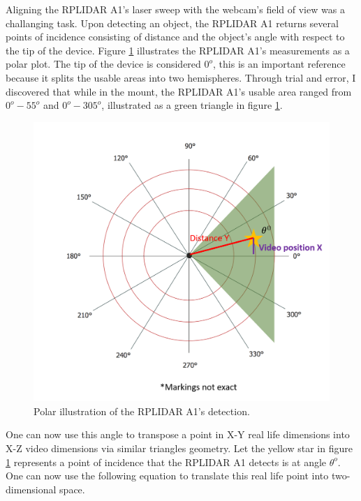 \documentclass[onecolumn, draftclsnofoot,10pt, compsoc]{IEEEtran}
\makeatletter
\newcommand\captionof[1]{\def\@captype{#1}\caption}
\makeatother
\begin{document}
\begin{singlespace}
		Aligning the RPLIDAR A1's laser sweep with the webcam's field of view was a challanging task.
		Upon detecting an object, the RPLIDAR A1 returns several points of incidence consisting of distance and the object's angle with respect to the tip of the device.
		Figure \ref{polar} illustrates the RPLIDAR A1's measurements as a polar plot.
		The tip of the device is considered \( 0^o \), this is an important reference because it splits the usable areas into two hemispheres.
		Through trial and error, I discovered that while in the mount, the RPLIDAR A1's usable area ranged from \( 0^o - 55^o\) and \( 0^o - 305^o\), illustrated as a green triangle in figure \ref{polar}.

		\begin{figure}[H]
		\includegraphics[scale=0.4]{polar.png}
		\captionof{figure}{Polar illustration of the RPLIDAR A1's detection.}
		\label{polar}
		\end{figure}


		One can now use this angle to transpose a point in X-Y real life dimensions into X-Z video dimensions via similar triangles geometry.
		Let the yellow star in figure \ref{polar} represents a point of incidence that the RPLIDAR A1 detects is at angle \( \theta^o\).
		One can now use the following equation to translate this real life point into two-dimensional space.



\end{singlespace}
\end{document}
